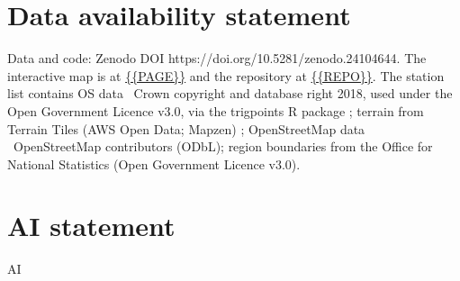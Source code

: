 \documentclass[11pt,a4paper]{article}
\begin{document}
\section*{Data availability statement}
Data and code: Zenodo DOI https://doi.org/10.5281/zenodo.24104644. The interactive map is at \url{{{PAGE}}} and the repository at \url{{{REPO}}}. The station list contains OS data \textcopyright\ Crown copyright and database right 2018, used under the Open Government Licence v3.0, via the trigpoints R package \citep{jones2018}; terrain from Terrain Tiles (AWS Open Data; Mapzen) \citep{tilezen}; OpenStreetMap data \textcopyright\ OpenStreetMap contributors (ODbL); region boundaries from the Office for National Statistics (Open Government Licence v3.0).

\section*{AI statement}
{{AI}}
\end{document}
